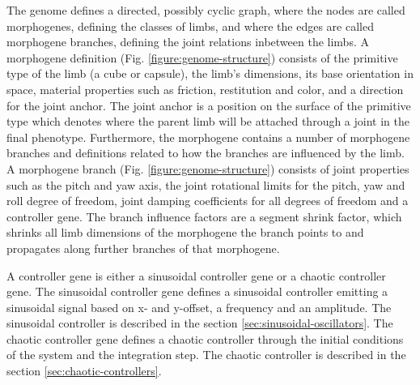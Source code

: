 \documentclass[main]{subfiles}
\begin{document}

The genome defines a directed, possibly cyclic graph, where the nodes are called morphogenes, defining the classes of limbs, and where the edges are called morphogene branches, defining the joint relations inbetween the limbs. A morphogene definition (Fig. \ref{figure:genome-structure}) consists of the primitive type of the limb (a cube or capsule), the limb's dimensions, its base orientation in space, material properties such as friction, restitution and color, and a direction for the joint anchor. The joint anchor is a position on the surface of the primitive type which denotes where the parent limb will be attached through a joint in the final phenotype. Furthermore, the morphogene contains a number of morphogene branches and definitions related to how the branches are influenced by the limb. \\

A morphogene branch (Fig. \ref{figure:genome-structure}) consists of joint properties such as the pitch and yaw axis, the joint rotational limits for the pitch, yaw and roll degree of freedom, joint damping coefficients for all degrees of freedom and a controller gene.
The branch influence factors are a segment shrink factor, which shrinks all limb dimensions of the morphogene the branch points to and propagates along further branches of that morphogene.

A controller gene is either a sinusoidal controller gene or a chaotic controller gene.  The sinusoidal controller gene defines a sinusoidal controller emitting a sinusoidal signal based on x- and y-offset, a frequency and an amplitude. The sinusoidal controller is described in the section \ref{sec:sinusoidal-oscillators}. The chaotic controller gene defines a chaotic controller through the initial conditions of the system and the integration step. The chaotic controller is described in the section \ref{sec:chaotic-controllers}.
\end{document}
